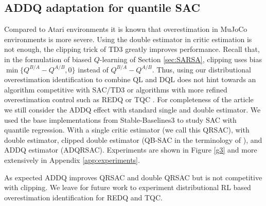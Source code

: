 \documentclass{article}
\theoremstyle{plain}
\theoremstyle{definition}
\theoremstyle{remark}
\begin{document}
\subsection{ADDQ adaptation for quantile SAC}\label{sec:AC}
Compared to Atari environments it is known that overestimation in MuJoCo environments is more severe.  Using the double estimator in critic estimation is not enough, the clipping trick of TD3 \cite{fujimoto2018addressing} greatly improves performance. Recall that, in the formulation of biased $Q$-learning of Section \ref{sec:SARSA}, clipping uses bias $\min\{ Q^{B/A}-  Q^{A/B},0\}$ instead of $Q^{B/A}-Q^{A/B}$. Thus, using our distributional overestimation identification to combine QL and DQL does not hint towards an algorithm competitive with SAC/TD3 or algorithms with more refined overestimation control such as REDQ \cite {redq} or TQC \cite{tqc}. For completeness of the article we still consider the ADDQ effect with standard single and double estimator. We used the base implementations from Stable-Baselines3 to study SAC with quantile regression. With a single critic estimator (we call this QRSAC), with double estimator, clipped double estimator (QB-SAC in the terminology of \cite{tqc}), and ADDQ estimator (ADQRSAC). Experiments are shown in Figure \ref{g3} and more extensively in Appendix \ref{app:experiments}.

As expected ADDQ improves QRSAC and double QRSAC but is not competitive with clipping. We leave for future work to experiment distributional RL based overestimation identification for REDQ and TQC.
\end{document}
